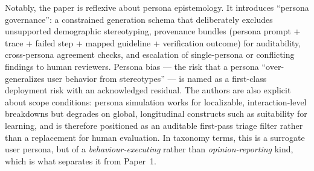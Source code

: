 Notably, the paper is reflexive about persona epistemology. It introduces ``persona
governance'': a constrained generation schema that deliberately excludes unsupported
demographic stereotyping, provenance bundles (persona prompt + trace + failed step + mapped
guideline + verification outcome) for auditability, cross-persona agreement checks, and
escalation of single-persona or conflicting findings to human reviewers. Persona bias --- the
risk that a persona ``over-generalizes user behavior from stereotypes'' --- is named as a
first-class deployment risk with an acknowledged residual. The authors are also explicit about
scope conditions: persona simulation works for localizable, interaction-level breakdowns but
degrades on global, longitudinal constructs such as suitability for learning, and is therefore
positioned as an auditable first-pass triage filter rather than a replacement for human
evaluation. In taxonomy terms, this is a surrogate user persona, but of a \emph{behaviour-executing}
rather than \emph{opinion-reporting} kind, which is what separates it from Paper~1.


